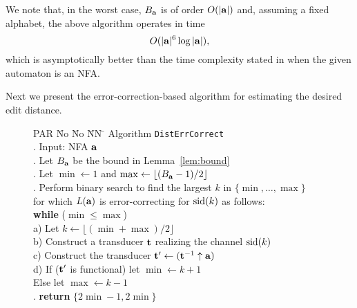 \documentclass{article}
\theoremstyle{plain}
\theoremstyle{definition}
\theoremstyle{remark}
\newcommand\db{B}             \newcommand\dbold{D}   \newcommand\pssi{\par\smallskip\indent}
\begin{document}
We note that, in the worst case, $\db_{\aut}$ is
of order $O(|\mathbf{a}|)$ and, assuming a fixed alphabet, the above algorithm operates in time
$$O(|\mathbf{a}|^6\log|\mathbf{a}|),$$
which  is asymptotically better
than the time complexity stated in \cite{Kon:2007} when the
given automaton is an NFA.

\pssi
Next we present
the error-correction-based algorithm for estimating
the desired edit distance.

\begin{figure}[ht]
\begin{tabbing}
PAR \= No \= No \= NN \= \kill
\> Algorithm \texttt{DistErrCorrect} \\
.\> Input: NFA $\mathbf{a}$ \hspace{4mm} \\
.\> Let ${\db_\aut}$ be the bound in Lemma~\ref{lem:bound}\\
.\> Let $\min\leftarrow 1$ and $\max\leftarrow\lfloor({\db_\aut}-1)/2\rfloor$\\
.\> Perform binary search to find  the largest $k$ in
      $\{\min,\ldots,\max\}$ \\
\>  \> for which $L(\mathbf{a})$ is error-correcting for $\mathrm{sid}(k)$ as follows: \\
\>  \>  \textbf{while} ($\min\le \max$)\\
\>  \>  a)\> Let $k\leftarrow\lfloor(\min+\max)/2\rfloor$\\
\>   \> b)\> Construct a transducer $\mathbf{t}$ realizing the channel $\mathrm{sid}(k)$\\
\>   \> c)\> Construct the transducer $\mathbf{t}'\leftarrow(\mathbf{t}^{-1}\uparrow\mathbf{a})$\\
\>   \> d)\> If ($\mathbf{t}'$ is functional)  let $\min\leftarrow k+1$\\
\>   \> \>  Else  let $\max\leftarrow k-1$\\
. \>  \textbf{return} $\{2\min-1,2\min\}$
\end{tabbing}
\end{figure}
\end{document}
